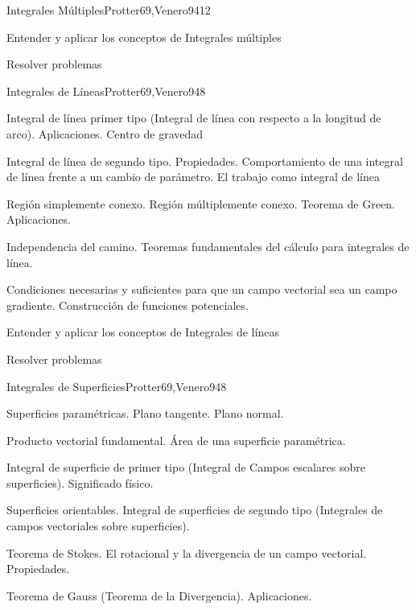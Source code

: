 \begin{syllabus}
\begin{unit}{Integrales Múltiples}{Protter69,Venero94}{12}
   \begin{unitgoals}
         \item  Entender y aplicar los conceptos de Integrales múltiples
         \item  Resolver problemas
   \end{unitgoals}
\end{unit}

\begin{unit}{Integrales de Líneas}{Protter69,Venero94}{8}
   \begin{topics}
	\item  Integral de línea primer tipo (Integral de línea con respecto a la longitud de arco). Aplicaciones. Centro de gravedad
	\item  Integral de línea de segundo tipo. Propiedades. Comportamiento de una integral de línea frente a un cambio de parámetro. El trabajo como integral de línea
	\item  Región simplemente conexo. Región múltiplemente conexo. Teorema de Green. Aplicaciones.
	\item  Independencia del camino. Teoremas fundamentales del cálculo para integrales de línea.
	\item Condiciones necesarias y suficientes para que un campo vectorial sea un campo gradiente. Construcción de funciones potenciales.
   \end{topics}

   \begin{unitgoals}
         \item  Entender y aplicar los conceptos de Integrales de líneas
         \item  Resolver problemas
   \end{unitgoals}
\end{unit}

\begin{unit}{Integrales de Superficies}{Protter69,Venero94}{8}
   \begin{topics}
         \item  Superficies paramétricas. Plano tangente. Plano normal.
	 \item  Producto vectorial fundamental. Área de una superficie paramétrica.
         \item  Integral de superficie de primer tipo (Integral de Campos escalares sobre superficies). Significado físico.
	 \item  Superficies orientables. Integral de superficies de segundo tipo (Integrales de campos vectoriales sobre superficies).
         \item  Teorema de Stokes. El rotacional y la divergencia de un campo vectorial. Propiedades.
         \item  Teorema de Gauss (Teorema de la Divergencia). Aplicaciones.
   \end{topics}


\end{unit}
\end{syllabus}
